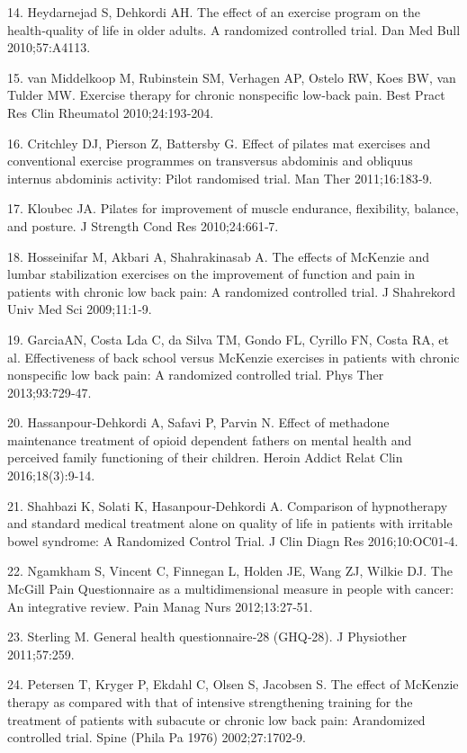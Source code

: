 \documentclass[a5paper]{article}
\theoremstyle{definition}
\begin{document}
14. Heydarnejad S, Dehkordi AH. The effect of an exercise program on the
health‑quality of life in older adults. A randomized controlled trial. Dan
Med Bull 2010;57:A4113.

15. van Middelkoop M, Rubinstein SM, Verhagen AP, Ostelo RW,
Koes BW, van Tulder MW. Exercise therapy for chronic nonspecific
low‑back pain. Best Pract Res Clin Rheumatol 2010;24:193‑204.

16. Critchley DJ, Pierson Z, Battersby G. Effect of pilates mat exercises
and conventional exercise programmes on transversus abdominis and
obliquus internus abdominis activity: Pilot randomised trial. Man Ther
2011;16:183‑9.

17. Kloubec JA. Pilates for improvement of muscle endurance, flexibility,
balance, and posture. J Strength Cond Res 2010;24:661‑7.

18. Hosseinifar M, Akbari A, Shahrakinasab A. The effects of McKenzie
and lumbar stabilization exercises on the improvement of function and
pain in patients with chronic low back pain: A randomized controlled
trial. J Shahrekord Univ Med Sci 2009;11:1‑9.

19. GarciaAN, Costa Lda C, da Silva TM, Gondo FL, Cyrillo FN, Costa RA,
et al. Effectiveness of back school versus McKenzie exercises in patients
with chronic nonspecific low back pain: A randomized controlled trial.
Phys Ther 2013;93:729‑47.

20. Hassanpour‑Dehkordi A, Safavi P, Parvin N. Effect of methadone
maintenance treatment of opioid dependent fathers on mental health and
perceived family functioning of their children. Heroin Addict Relat Clin
2016;18(3):9-14.

21. Shahbazi K, Solati K, Hasanpour‑Dehkordi A. Comparison of
hypnotherapy and standard medical treatment alone on quality of life
in patients with irritable bowel syndrome: A Randomized Control Trial.
J Clin Diagn Res 2016;10:OC01‑4.

22. Ngamkham S, Vincent C, Finnegan L, Holden JE, Wang ZJ, Wilkie DJ.
The McGill Pain Questionnaire as a multidimensional measure in people
with cancer: An integrative review. Pain Manag Nurs 2012;13:27‑51.

23. Sterling M. General health questionnaire‑28 (GHQ‑28). J Physiother
2011;57:259.

24. Petersen T, Kryger P, Ekdahl C, Olsen S, Jacobsen S. The effect of
McKenzie therapy as compared with that of intensive strengthening
training for the treatment of patients with subacute or chronic low back
pain: Arandomized controlled trial. Spine (Phila Pa 1976) 2002;27:1702‑9.
\end{document}
